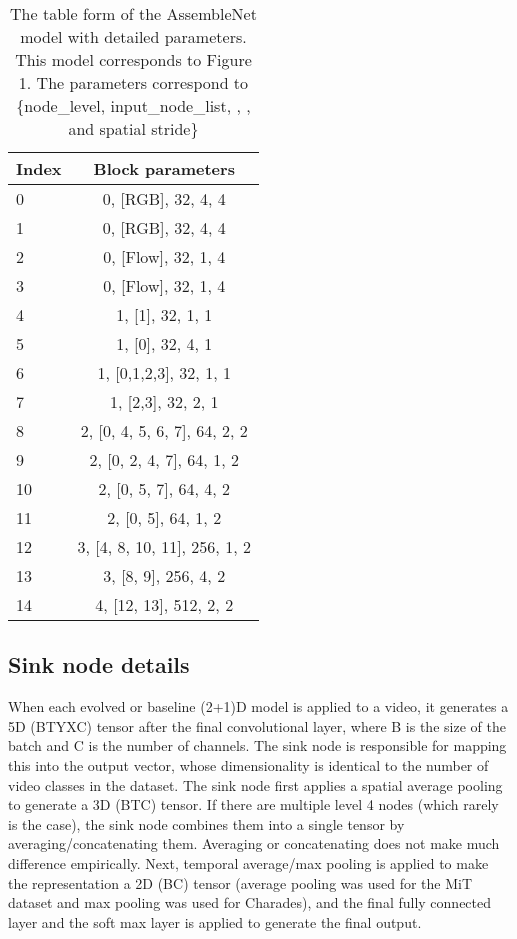 \documentclass{article} \usepackage{iclr2020_conference,times}
\begin{document}
\begin{table}
    \centering
    \setlength\tabcolsep{5pt}
    \caption{The table form of the AssembleNet model with detailed parameters. This model corresponds to Figure 1. The parameters correspond to \{node\_level, input\_node\_list, , , and spatial stride\}}
    \label{tab:model}
    \begin{tabular}{|l|c|}
    \hline
      Index & Block parameters\\
    \hline
    0 & 0, [RGB], 32, 4, 4 \\ \hline
    1 & 0, [RGB], 32, 4, 4 \\ \hline
    2 & 0, [Flow], 32, 1, 4 \\ \hline
    3 & 0, [Flow], 32, 1, 4 \\ \hline
    4 & 1, [1], 32, 1, 1 \\ \hline
    5 & 1, [0], 32, 4, 1 \\ \hline
    6 & 1, [0,1,2,3], 32, 1, 1 \\ \hline
    7 & 1, [2,3], 32, 2, 1 \\ \hline
    8 & 2, [0, 4, 5, 6, 7], 64, 2, 2 \\ \hline
    9 & 2, [0, 2, 4, 7], 64, 1, 2 \\ \hline 
    10 & 2, [0, 5, 7], 64, 4, 2 \\ \hline
    11 & 2, [0, 5], 64, 1, 2 \\ \hline
    12 & 3, [4, 8, 10, 11], 256, 1, 2 \\ \hline
    13 & 3, [8, 9], 256, 4, 2 \\ \hline
    14 & 4, [12, 13], 512, 2, 2 \\
    \hline
    \end{tabular}
\end{table}


\subsection{Sink node details}

When each evolved or baseline (2+1)D model is applied to a video, it generates a 5D (BTYXC) tensor after the final convolutional layer, where B is the size of the batch and C is the number of channels. The sink node is responsible for mapping this into the output vector, whose dimensionality is identical to the number of video classes in the dataset. The sink node first applies a spatial average pooling to generate a 3D (BTC) tensor. If there are multiple level 4 nodes (which rarely is the case), the sink node combines them into a single tensor by averaging/concatenating them. Averaging or concatenating does not make much difference empirically. Next, temporal average/max pooling is applied to make the representation a 2D (BC) tensor (average pooling was used for the MiT dataset and max pooling was used for Charades), and the final fully connected layer and the soft max layer is applied to generate the final output.
\end{document}
